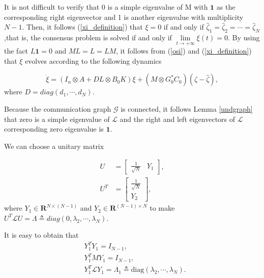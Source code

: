 \documentclass[english]{cccconf}
\begin{document}
It is not difficult to verify that 0 is a simple eigenvalue of M with $\mathbf 1$ as the corresponding right eigenvector and 1 is another eigenvalue with multiplicity $N-1$. Then, it follows (\ref{xi_definition}) that $\xi=0$ if and only if $\hat \zeta_1 = \hat \zeta _2 = \cdots = \hat \zeta_N$,that is, the consensus problem is solved if and only if $\mathop{lim}\limits_{t \to +\infty} \xi(t)=0$. By using the fact $L \mathbf 1 = 0$ and $ML = L = LM$, it follows from (\ref{osi}) and (\ref{xi_definition}) that $\xi$ evolves according to the following dynamics

\begin{equation}
\label{xi}
\dot \xi = (I_n \otimes A + DL \otimes B_0 K)  \xi + (M \otimes G_0^{*} C_0)(\zeta - \hat \zeta),
\end{equation} where $D = diag(d_1, \cdots, d_N)$.

Because the communication graph $\mathcal G$ is connected, it follows Lemma \ref{undgraph} that zero is a simple eigenvalue of $\mathcal L$ and the right and left eigenvectors of $\mathcal L$ corresponding zero eigenvalue is $\mathbf 1$. 

We can choose a unitary matrix 

\begin{equation}
\begin{align}
U &= \begin{bmatrix} \frac{1}{\sqrt{N}}  & Y_1\end{bmatrix}, \\ U^T &= \begin{bmatrix} \frac{1}{\sqrt{N}}  \\ Y_2\end{bmatrix},
\end{align}
\end{equation} where $Y_1 \in \mathbf R^{N \times (N-1)}$ and $Y_2 \in \mathbf R^{(N-1) \times N}$ to make $U^T \mathcal L U = \Lambda \triangleq diag(0,\lambda_2,\cdots,\lambda_N)$.

It is easy to obtain that
\begin{equation}\label{uzhenxingzhi}
\begin{aligned}
 & Y_1^TY_1=I_{N-1},\\ &   Y_1^TMY_1=I_{N-1},\\
 & Y_1^T\mathcal LY_1=\Lambda_1\triangleq\mathrm{diag}(\lambda_2,\cdots,\lambda_N).
  \end{aligned}
\end{equation}
 
\end{document}

